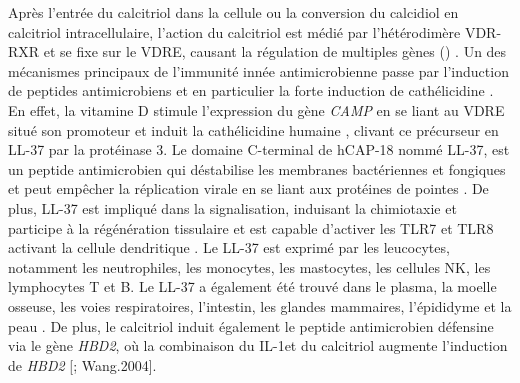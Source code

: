 \documentclass[
  a4paper,
  DIV=11,
  numbers=noendperiod,
  listof=totoc]{scrreprt}
\begin{document}
Après l'entrée du calcitriol dans la cellule ou la conversion du
calcidiol en calcitriol intracellulaire, l'action du calcitriol est
médié par l'hétérodimère \ac{VDR}-\ac{RXR} et se fixe sur le \ac{VDRE},
causant la régulation de multiples gènes
() \autocite{Caprio.2017,Yasmin.2005}. Un
des mécanismes principaux de l'immunité innée antimicrobienne passe par
l'induction de peptides antimicrobiens et en particulier la forte
induction de cathélicidine \autocite{Wang.2004}. En effet, la vitamine D
stimule l'expression du gène \emph{CAMP} en se liant au \ac{VDRE} situé
son promoteur et induit la cathélicidine humaine , clivant
ce précurseur en LL-37 par la protéinase 3. Le domaine C-terminal de
\ac{hCAP-18} nommé LL-37, est un peptide antimicrobien qui déstabilise
les membranes bactériennes et fongiques et peut empêcher la réplication
virale en se liant aux protéines de pointes
\autocite{Bishop.2021,Charoenngam.2020}. De plus, LL-37 est impliqué
dans la signalisation, induisant la chimiotaxie et participe à la
régénération tissulaire et est capable d'activer les \ac{TLR}7 et
\ac{TLR}8 activant la cellule dendritique \autocite{Silva.2012}. Le
LL-37 est exprimé par les leucocytes, notamment les neutrophiles, les
monocytes, les mastocytes, les cellules NK, les lymphocytes T et B. Le
LL-37 a également été trouvé dans le plasma, la moelle osseuse, les
voies respiratoires, l'intestin, les glandes mammaires, l'épididyme et
la peau \autocite{Silva.2012}. De plus, le calcitriol induit également
le peptide antimicrobien défensine  via le gène \emph{HBD2},
où la combinaison du IL-1\mupbeta et du calcitriol augmente l'induction
de \emph{HBD2} {[}\textcite{Bishop.2021}; Wang.2004{]}.
\end{document}
